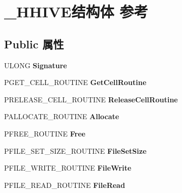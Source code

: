 \hypertarget{struct___h_h_i_v_e}{}\section{\+\_\+\+H\+H\+I\+V\+E结构体 参考}
\label{struct___h_h_i_v_e}
\subsection*{Public 属性}
\begin{DoxyCompactItemize}
\item 
\mbox{\label{struct___h_h_i_v_e_a37ab4f6f7ea19a25b192ca17717eac5c}} 
U\+L\+O\+NG {\bfseries Signature}
\item 
\mbox{\label{struct___h_h_i_v_e_aa6eb883ff0d01c3e1781509580021116}} 
P\+G\+E\+T\+\_\+\+C\+E\+L\+L\+\_\+\+R\+O\+U\+T\+I\+NE {\bfseries Get\+Cell\+Routine}
\item 
\mbox{\label{struct___h_h_i_v_e_aba023fa7a2a6ea95120c3ca046792698}} 
P\+R\+E\+L\+E\+A\+S\+E\+\_\+\+C\+E\+L\+L\+\_\+\+R\+O\+U\+T\+I\+NE {\bfseries Release\+Cell\+Routine}
\item 
\mbox{\label{struct___h_h_i_v_e_a4ed8b3849a5623fa50b554bfbc4716c0}} 
P\+A\+L\+L\+O\+C\+A\+T\+E\+\_\+\+R\+O\+U\+T\+I\+NE {\bfseries Allocate}
\item 
\mbox{\label{struct___h_h_i_v_e_aada7009d3ef63c34a7383dbd079e30e8}} 
P\+F\+R\+E\+E\+\_\+\+R\+O\+U\+T\+I\+NE {\bfseries Free}
\item 
\mbox{\label{struct___h_h_i_v_e_a376b66fbc2798a5124b9be8245986bb8}} 
P\+F\+I\+L\+E\+\_\+\+S\+E\+T\+\_\+\+S\+I\+Z\+E\+\_\+\+R\+O\+U\+T\+I\+NE {\bfseries File\+Set\+Size}
\item 
\mbox{\label{struct___h_h_i_v_e_a42feb606702a8c6cce92db78f123e596}} 
P\+F\+I\+L\+E\+\_\+\+W\+R\+I\+T\+E\+\_\+\+R\+O\+U\+T\+I\+NE {\bfseries File\+Write}
\item 
\mbox{\label{struct___h_h_i_v_e_a62263ef65937a84c72c649d226805c31}} 
P\+F\+I\+L\+E\+\_\+\+R\+E\+A\+D\+\_\+\+R\+O\+U\+T\+I\+NE {\bfseries File\+Read}

\end{DoxyCompactItemize}
